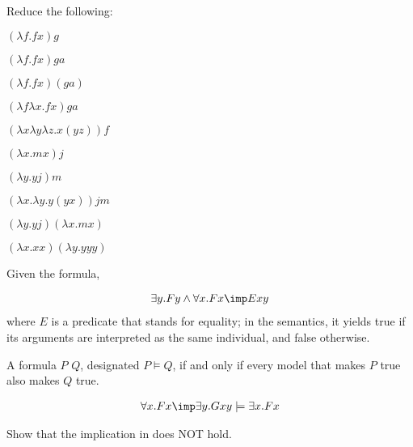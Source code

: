 \documentclass[10pt,a4paper]{exam}
\begin{document}
\begin{questions}
\question[20] Reduce the following:

\begin{parts}
\item $(\lambda f.fx)g $
\item $(\lambda f.fx)ga$
\item $(\lambda f.fx)(ga)$
\item $(\lambda f\lambda x.fx)g a$
\item $(\lambda x\lambda y \lambda z.x(yz))f$
\item $(\lambda x. m x)j$
\item $(\lambda y. y j)m$
\item $(\lambda x.\lambda y. y(y x))jm$
\item $(\lambda y.y j)(\lambda x. m x)$
\item $(\lambda x. xx)(\lambda y. yyy)$
\end{parts}

\question[20] Given the formula,

\begin{align}\label{one}
\exists y.Fy\land \forall x.Fx \imp Exy
\end{align}
where $E$ is a predicate that stands for equality; in the semantics, it yields true if its arguments are interpreted as the same individual, and false otherwise. 


\question[20]

A formula $P$  $Q$, designated $P\models Q$, if and only if every model that makes $P$ true also makes $Q$ true.

\begin{align}\label{imp}
\forall x.Fx \imp \exists y.Gxy \models \exists x.Fx
\end{align}

Show that the implication in  does NOT hold.


\end{questions}
\end{document}
